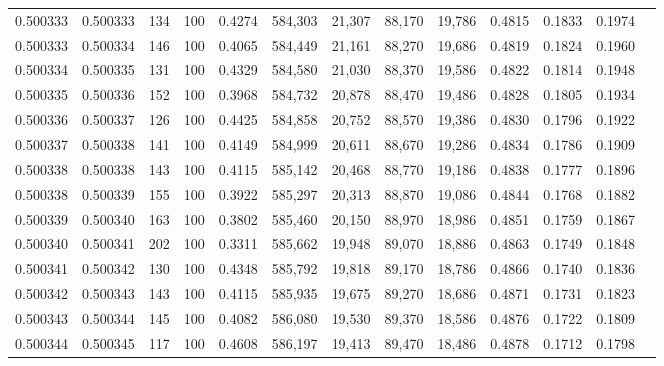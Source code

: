 \begin{tabular}{rrrrrrrrrrrrr}
0.500333 & 0.500333 &   134 & 100 &                                     0.4274 & 584,303 &  21,307 &  88,170 &  19,786 & 0.4815 & 0.1833 & 0.1974 \\
0.500333 & 0.500334 &   146 & 100 &                                     0.4065 & 584,449 &  21,161 &  88,270 &  19,686 & 0.4819 & 0.1824 & 0.1960 \\
0.500334 & 0.500335 &   131 & 100 &                                     0.4329 & 584,580 &  21,030 &  88,370 &  19,586 & 0.4822 & 0.1814 & 0.1948 \\
0.500335 & 0.500336 &   152 & 100 &                                     0.3968 & 584,732 &  20,878 &  88,470 &  19,486 & 0.4828 & 0.1805 & 0.1934 \\
0.500336 & 0.500337 &   126 & 100 &                                     0.4425 & 584,858 &  20,752 &  88,570 &  19,386 & 0.4830 & 0.1796 & 0.1922 \\
0.500337 & 0.500338 &   141 & 100 &                                     0.4149 & 584,999 &  20,611 &  88,670 &  19,286 & 0.4834 & 0.1786 & 0.1909 \\
0.500338 & 0.500338 &   143 & 100 &                                     0.4115 & 585,142 &  20,468 &  88,770 &  19,186 & 0.4838 & 0.1777 & 0.1896 \\
0.500338 & 0.500339 &   155 & 100 &                                     0.3922 & 585,297 &  20,313 &  88,870 &  19,086 & 0.4844 & 0.1768 & 0.1882 \\
0.500339 & 0.500340 &   163 & 100 &                                     0.3802 & 585,460 &  20,150 &  88,970 &  18,986 & 0.4851 & 0.1759 & 0.1867 \\
0.500340 & 0.500341 &   202 & 100 &                                     0.3311 & 585,662 &  19,948 &  89,070 &  18,886 & 0.4863 & 0.1749 & 0.1848 \\
0.500341 & 0.500342 &   130 & 100 &                                     0.4348 & 585,792 &  19,818 &  89,170 &  18,786 & 0.4866 & 0.1740 & 0.1836 \\
0.500342 & 0.500343 &   143 & 100 &                                     0.4115 & 585,935 &  19,675 &  89,270 &  18,686 & 0.4871 & 0.1731 & 0.1823 \\
0.500343 & 0.500344 &   145 & 100 &                                     0.4082 & 586,080 &  19,530 &  89,370 &  18,586 & 0.4876 & 0.1722 & 0.1809 \\
0.500344 & 0.500345 &   117 & 100 &                                     0.4608 & 586,197 &  19,413 &  89,470 &  18,486 & 0.4878 & 0.1712 & 0.1798 \\

\end{tabular}
